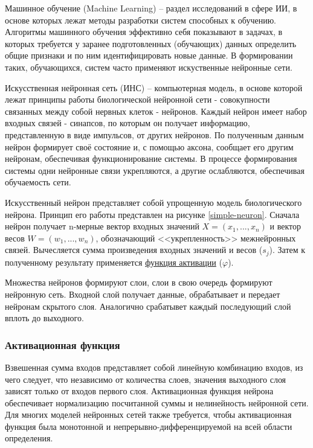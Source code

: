 Машинное обучение (Machine Learning) – раздел исследований в сфере ИИ, в основе которых лежат методы разработки систем способных к обучению. Алгоритмы машинного обучения эффективно себя показывают в задачах, в которых требуется у заранее подготовленных (обучающих) данных определить общие признаки и по ним идентифицировать новые данные. В формировании таких, обучающихся, систем часто применяют искуственные нейронные сети. 

Искусственная нейронная сеть (ИНС) – компьютерная модель, в основе которой лежат принципы работы биологической нейронной сети - совокупности связанных между собой нервных клеток - нейронов. Каждый нейрон имеет набор входных связей - синапсов, по которым он получает информацию, представленную в виде импульсов, от других нейронов. По полученным данным нейрон формирует своё состояние и, с помощью аксона, сообщает его другим нейронам, обеспечивая функционирование системы. В процессе формирования системы одни нейронные связи укрепляются, а другие ослабляются, обеспечивая обучаемость сети.

Искусственный нейрон представляет собой упрощенную модель биологического нейрона. Принцип его работы представлен на рисунке \ref{simple-neuron}. Сначала нейрон получает n-мерные вектор входных значений $X=(x_{1},...,x_{n})$ и вектор весов $W=(w_{1},...,w_{n})$, обозначающий <<укрепленность>> межнейронных связей. Вычесляется сумма произведения входных значений и весов ($s_j$). Затем к полученному результату применяется \hyperref[sec:activation]{функция активации} ($\varphi$). 


Множества нейронов формируют слои, слои в свою очередь формируют нейронную сеть. Входной слой получает данные, обрабатывает и передает нейронам скрытого слоя. Аналогично срабатывет каждый последующий слой вплоть до выходного. 


\subsubsection{Активационная функция}
\label{sec:activation}
Взвешенная сумма входов представляет собой линейную комбинацию входов, из чего следует, что независимо от количества слоев, значения выходного слоя зависят только от входов первого слоя. 
Активационная функция нейрона обеспечивает нормализацию посчитанной суммы и нелинейность нейронной сети. Для многих моделей нейронных сетей также требуется, чтобы активационная функция была монотонной и непрерывно-дифференцируемой на всей области определения.

